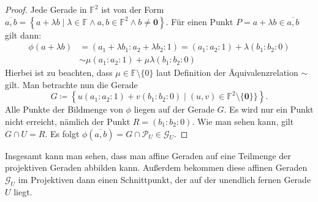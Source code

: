 \documentclass[hidelinks]{article}
\theoremstyle{plain}
\theoremstyle{definition}
\theoremstyle{rem}
\newcommand{\fnz}{\mathbb{F}\setminus\{0\}}
\newcommand{\ftwnz}{\mathbb{F}^{2}\setminus\{\boldsymbol 0\}}
\newcommand{\pu}{\mathcal{P}_U}
\newcommand{\gu}{\mathcal{G}_U}
\begin{document}
\begin{sloppypar}
\begin{proof}
    \newline
    Jede Gerade in $\mathbb{F}^2$ ist von der Form $\overline{a,b} = \left\{ a + \lambda b \mid \lambda \in \mathbb{F}\land a,b \in \mathbb{F}^2 \land b \neq \boldsymbol 0 \right\}$. Für einen Punkt $P = a + \lambda b \in \overline{a,b}$ gilt dann:
    \begin{equation*}
        \begin{aligned}
            \phi(a + \lambda b) & = (a_1 + \lambda b_1 : a_2 + \lambda b_2 : 1) = (a_1 : a_2 : 1) + \lambda (b_1 : b_2 : 0) \\
            & \sim \mu (a_1 : a_2 : 1) + \mu \lambda (b_1 : b_2 : 0)
        \end{aligned}
    \end{equation*}
    Hierbei ist zu beachten, dass $\mu \in \fnz$ laut Definition der Äquivalenzrelation $\sim$ gilt. Man betrachte nun die Gerade
    \begin{equation*}
        G \coloneqq \left\{ u(a_1 : a_2 : 1) + v(b_1 : b_2 : 0) \mid (u,v) \in \ftwnz\} \right\}.
    \end{equation*}
    Alle Punkte der Bildmenge von $\phi$ liegen auf der Gerade $G$. Es wird nur ein Punkt nicht erreicht, nämlich der Punkt $R = (b_1 : b_2 : 0)$. Wie man sehen kann, gilt $G \cap U = R$. Es folgt $\phi(\overline{a,b}) = G \cap \pu \in \gu$.
\end{proof}
Insgesamt kann man sehen, dass man affine Geraden auf eine Teilmenge der projektiven Geraden abbilden kann. Außerdem bekommen diese affinen Geraden $\gu$ im Projektiven dann einen Schnittpunkt, der auf der unendlich fernen Gerade $U$ liegt.

\end{sloppypar}
\end{document}
